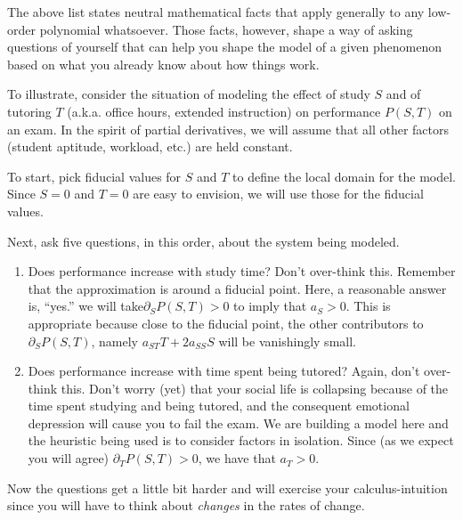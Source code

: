 \documentclass[
  letterpaper,
  DIV=11,
  numbers=noendperiod,
  oneside]{scrreprt}
\providecommand{\tightlist}{%
  \setlength{\itemsep}{0pt}\setlength{\parskip}{0pt}}
\begin{document}
The above list states neutral mathematical facts that apply generally to
any low-order polynomial whatsoever. Those facts, however, shape a way of asking questions
of yourself that can help you shape the model of a given phenomenon
based on what you already know about how things work.

To illustrate, consider the situation of modeling the effect of study
\(S\) and of tutoring \(T\) (a.k.a. office hours, extended instruction)
on performance \(P(S,T)\) on an exam. In the spirit of partial
derivatives, we will assume that all other factors (student aptitude,
workload, etc.) are held constant.

To start, pick fiducial values for \(S\) and \(T\) to define the local
domain for the model. Since \(S=0\) and \(T=0\) are easy to envision, we
will use those for the fiducial values.

Next, ask five questions, in this order, about the system being modeled.

\begin{enumerate}
\def\labelenumi{\arabic{enumi}.}
\tightlist
\item
  Does performance increase with study time? Don't over-think this.
  Remember that the approximation is around a fiducial point. Here, a
  reasonable answer is, ``yes.'' we will take\(\partial_S P(S, T) > 0\)
  to imply that \(a_S > 0\). This is appropriate because close to the
  fiducial point, the other contributors to \(\partial_S P(S, T)\),
  namely \(a_{ST}T + 2 a_{SS} S\) will be vanishingly small.
\item
  Does performance increase with time spent being tutored? Again, don't
  over-think this. Don't worry (yet) that your social life is collapsing
  because of the time spent studying and being tutored, and the
  consequent emotional depression will cause you to fail the exam. We
  are building a model here and the heuristic being used is to consider
  factors in isolation. Since (as we expect you will agree)
  \(\partial_T P(S, T) > 0\), we have that \(a_T > 0\).
\end{enumerate}

Now the questions get a little bit harder and will exercise your
calculus-intuition since you will have to think about \emph{changes} in
the rates of change.
\end{document}
